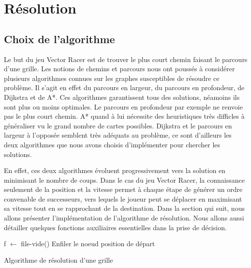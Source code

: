 \section{Résolution}
\subsection{Choix de l'algorithme}
Le but du jeu Vector Racer est de trouver le plus court chemin faisant le parcours d'une grille. Les notions de chemins et parcours nous ont poussés à considérer plusieurs algorithmes connues sur les graphes susceptibles de résoudre ce problème. Il s'agit en effet du parcours en largeur, du parcours en profondeur, de Dijkstra et de A*. Ces algorithmes garantissent tous des solutions, néamoins ils sont plus ou moins optimales. Le parcours en profondeur par exemple ne renvoie pas le plus court chemin. A* quand à lui nécessite des heuristiques très difficles à généraliser vu le grand nombre de cartes possibles. Dijkstra et le parcours en largeur à l'opposée semblent très adéquats au problème, ce sont d'ailleurs les deux algorithmes que nous avons choisis d'implémenter pour chercher les solutions.

En effet, ces deux algorithmes évoluent progressivement vers la solution en minimisant le nombre de coups. Dans le cas du jeu Vector Racer, la connaissance seulement de la position et la vitesse permet à chaque étape de générer un ordre convenable de successeurs, vers lequels le joueur peut se déplacer en maximisant sa vitesse tout en se rapprochant de la destination. Dans la section qui suit, nous allons présenter l'implémentation de l'algorithme de résolution. Nous allons aussi détailler quelques fonctions auxiliaires essentielles dans la prise de décision. \\

\begin{algorithm}[H]
 f $\leftarrow$ file-vide()\;
 Enfiler le noeud position de départ\;
 \caption{Algorithme de résolution d'une grille}
\end{algorithm}
